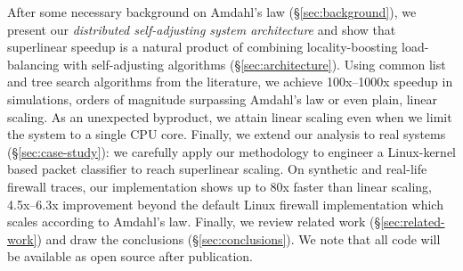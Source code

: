 After some necessary background on Amdahl's law (\S\ref{sec:background}), we present our \emph{distributed self-adjusting system architecture} and show that superlinear speedup is a natural product of combining locality-boosting load-balancing with self-adjusting algorithms (\S\ref{sec:architecture}). Using common list and tree search algorithms from the literature, we achieve 100x--1000x speedup in simulations, orders of magnitude surpassing Amdahl's law or even plain, linear scaling. As an unexpected byproduct, we attain linear scaling even when we limit the system to a single CPU core. Finally, we extend our analysis to real systems (\S\ref{sec:case-study}): we carefully apply our methodology to engineer a Linux-kernel based packet classifier to reach superlinear scaling. On synthetic and real-life firewall traces, our implementation shows up to 80x faster than linear scaling, 4.5x--6.3x improvement beyond the default Linux firewall implementation which scales according to Amdahl's law. Finally, we review related work (\S\ref{sec:related-work}) and draw the conclusions (\S\ref{sec:conclusions}). We note that all code will be available as open source after publication.


